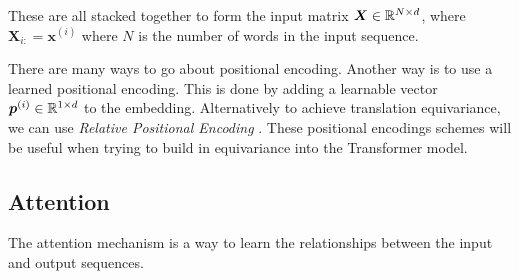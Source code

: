 \documentclass[../main.tex]{subfiles}
\begin{document}
\noi These are all stacked together to form the input matrix $\bm{X} \in \mathbb{R}^{N \times d}$, where $\bm{X}_{i:} = \bm{x}^{(i)}$ where $N$ is the number of words in the input sequence.

\begin{note}
	There are many ways to go about positional encoding. Another way is to use a learned positional encoding. This is done by adding a learnable vector $\bm{p}^{(i)} \in \mathbb{R}^{1 \times d}$ to the embedding. Alternatively to achieve translation equivariance, we can use \emph{Relative Positional Encoding} \cite{shaw2018selfattention, wu2021rethinking}. These positional encodings schemes will be useful when trying to build in equivariance into the Transformer model.
\end{note}


\subsection{Attention}

The attention mechanism is a way to learn the relationships between the input and output sequences. 


\end{document}
